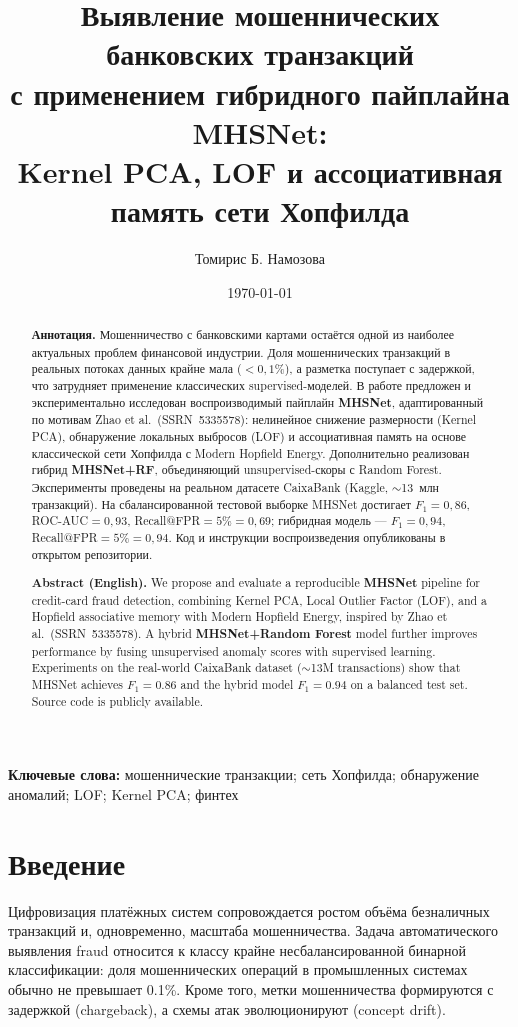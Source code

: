 \documentclass[12pt,a4paper]{article}
\title{%
  Выявление мошеннических банковских транзакций\\[0.3em]
  \large с применением гибридного пайплайна MHSNet:\\
  Kernel PCA, LOF и ассоциативная память сети Хопфилда
}
\author[1]{Томирис Б. Намозова}
\affil[1]{[Название университета, кафедра прикладной математики / информатики]\\
\texttt{tbnamozova@yoomoney.ru}}
\date{\today}
\newcommand{\keywords}[1]{\par\smallskip\noindent\textbf{Ключевые слова:} #1}
\begin{document}
\maketitle

\begin{abstract}
\noindent
\textbf{Аннотация.}
Мошенничество с банковскими картами остаётся одной из наиболее актуальных проблем финансовой индустрии.
Доля мошеннических транзакций в реальных потоках данных крайне мала ($<0{,}1\%$), а разметка поступает с задержкой,
что затрудняет применение классических supervised-моделей.
В работе предложен и экспериментально исследован воспроизводимый пайплайн \textbf{MHSNet},
адаптированный по мотивам Zhao et al.~(SSRN~5335578): нелинейное снижение размерности (Kernel PCA),
обнаружение локальных выбросов (LOF) и ассоциативная память на основе классической сети Хопфилда
с Modern Hopfield Energy.
Дополнительно реализован гибрид \textbf{MHSNet+RF}, объединяющий unsupervised-скоры с Random Forest.
Эксперименты проведены на реальном датасете CaixaBank (Kaggle, $\sim$13~млн транзакций).
На сбалансированной тестовой выборке MHSNet достигает $F_1=0{,}86$, ROC-AUC$=0{,}93$,
Recall@FPR$=5\%=0{,}69$; гибридная модель --- $F_1=0{,}94$, Recall@FPR$=5\%=0{,}94$.
Код и инструкции воспроизведения опубликованы в открытом репозитории.

\smallskip
\noindent
\textbf{Abstract (English).}
We propose and evaluate a reproducible \textbf{MHSNet} pipeline for credit-card fraud detection,
combining Kernel PCA, Local Outlier Factor (LOF), and a Hopfield associative memory with Modern Hopfield Energy,
inspired by Zhao et al.~(SSRN~5335578).
A hybrid \textbf{MHSNet+Random Forest} model further improves performance by fusing unsupervised anomaly scores
with supervised learning.
Experiments on the real-world CaixaBank dataset ($\sim$13M transactions) show that MHSNet achieves
$F_1=0.86$ and the hybrid model $F_1=0.94$ on a balanced test set.
Source code is publicly available.
\end{abstract}

\keywords{мошеннические транзакции; сеть Хопфилда; обнаружение аномалий; LOF; Kernel PCA; финтех}

\section{Введение}
\label{sec:intro}

Цифровизация платёжных систем сопровождается ростом объёма безналичных транзакций и, одновременно,
масштаба мошенничества. Задача автоматического выявления fraud относится к классу крайне несбалансированной
бинарной классификации: доля мошеннических операций в промышленных системах обычно не превышает 0.1\%.
Кроме того, метки мошенничества формируются с задержкой (chargeback), а схемы атак эволюционируют
(concept drift).
\end{document}
